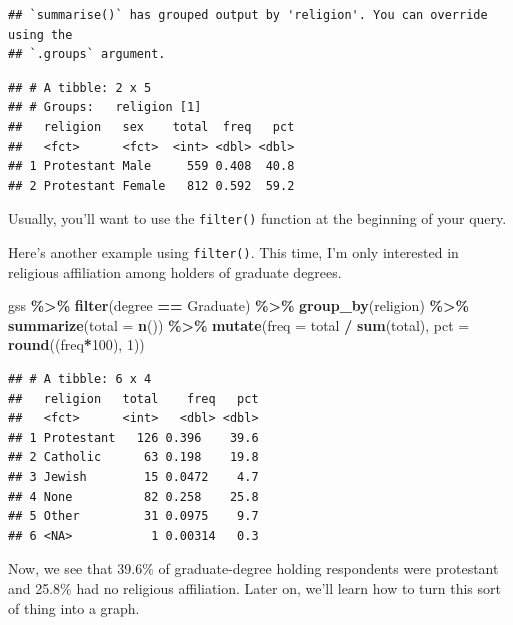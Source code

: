 \documentclass[
]{book}
\newenvironment{Shaded}{\begin{snugshade}}{\end{snugshade}}
\newcommand{\AttributeTok}[1]{\textcolor[rgb]{0.13,0.29,0.53}{#1}}
\newcommand{\DecValTok}[1]{\textcolor[rgb]{0.00,0.00,0.81}{#1}}
\newcommand{\FunctionTok}[1]{\textcolor[rgb]{0.13,0.29,0.53}{\textbf{#1}}}
\newcommand{\NormalTok}[1]{#1}
\newcommand{\SpecialCharTok}[1]{\textcolor[rgb]{0.81,0.36,0.00}{\textbf{#1}}}
\newcommand{\StringTok}[1]{\textcolor[rgb]{0.31,0.60,0.02}{#1}}
\begin{document}
\begin{verbatim}
## `summarise()` has grouped output by 'religion'. You can override using the
## `.groups` argument.
\end{verbatim}

\begin{verbatim}
## # A tibble: 2 x 5
## # Groups:   religion [1]
##   religion   sex    total  freq   pct
##   <fct>      <fct>  <int> <dbl> <dbl>
## 1 Protestant Male     559 0.408  40.8
## 2 Protestant Female   812 0.592  59.2
\end{verbatim}

Usually, you'll want to use the \texttt{filter()} function at the beginning of your query.

Here's another example using \texttt{filter()}. This time, I'm only interested in religious affiliation among holders of graduate degrees.

\begin{Shaded}
\begin{Highlighting}[]
\NormalTok{gss }\SpecialCharTok{\%\textgreater{}\%}
  \FunctionTok{filter}\NormalTok{(degree }\SpecialCharTok{==} \StringTok{\textquotesingle{}Graduate\textquotesingle{}}\NormalTok{) }\SpecialCharTok{\%\textgreater{}\%}
  \FunctionTok{group\_by}\NormalTok{(religion) }\SpecialCharTok{\%\textgreater{}\%}
  \FunctionTok{summarize}\NormalTok{(}\AttributeTok{total =} \FunctionTok{n}\NormalTok{()) }\SpecialCharTok{\%\textgreater{}\%}
  \FunctionTok{mutate}\NormalTok{(}\AttributeTok{freq =}\NormalTok{ total }\SpecialCharTok{/} \FunctionTok{sum}\NormalTok{(total),}
         \AttributeTok{pct =} \FunctionTok{round}\NormalTok{((freq}\SpecialCharTok{*}\DecValTok{100}\NormalTok{), }\DecValTok{1}\NormalTok{))}
\end{Highlighting}
\end{Shaded}

\begin{verbatim}
## # A tibble: 6 x 4
##   religion   total    freq   pct
##   <fct>      <int>   <dbl> <dbl>
## 1 Protestant   126 0.396    39.6
## 2 Catholic      63 0.198    19.8
## 3 Jewish        15 0.0472    4.7
## 4 None          82 0.258    25.8
## 5 Other         31 0.0975    9.7
## 6 <NA>           1 0.00314   0.3
\end{verbatim}

Now, we see that 39.6\% of graduate-degree holding respondents were protestant and 25.8\% had no religious affiliation. Later on, we'll learn how to turn this sort of thing into a graph.
\end{document}
